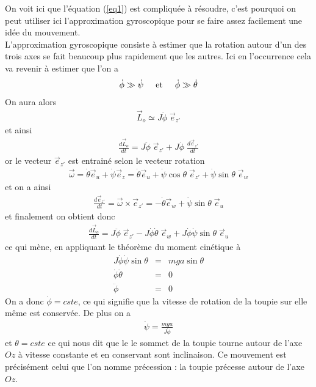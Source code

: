 \documentclass[12pt,prb,aps,epsf]{article}
\begin{document}
On voit ici que l'équation (\ref{eq1}) est compliquée à résoudre, c'est pourquoi on peut utiliser ici l'approximation gyroscopique pour se faire assez facilement une idée du mouvement.\\
L'approximation gyroscopique consiste à estimer que la rotation autour d'un des trois axes se fait beaucoup plus rapidement que les autres. Ici en l'occurrence cela va revenir à estimer que l'on a 
\begin{eqnarray}
\dot{\phi} \gg \dot{\psi}\hspace{0.5cm}\mathrm{et} \hspace{0.5cm} \dot{\phi} \gg \dot{\theta}
\end{eqnarray} 
On aura alors 
\begin{eqnarray}
\vec{L}_o \simeq J\dot{\phi}\; \vec{e}_{z'}
\end{eqnarray}
et ainsi 
\begin{eqnarray}
\frac{d\vec{L}_o}{dt} = J\ddot{\phi}\; \vec{e}_{z'} + J\dot{\phi}\; \frac{d\vec{e}_{z'}}{dt}
\end{eqnarray}
or le vecteur $\vec{e}_{z'}$ est entrainé selon le vecteur rotation 
\begin{eqnarray}
\vec{\omega} = \dot{\theta}\vec{e}_u + \dot{\psi}\vec{e}_z = \dot{\theta}\vec{e}_u + \dot{\psi}\cos{\theta}\; \vec{e}_{z'}  + \dot{\psi}\sin{\theta}\;\vec{e}_w
\end{eqnarray}
 et on a ainsi 
\begin{eqnarray}
 \frac{d\vec{e}_{z'}}{dt} = \vec{\omega}\times \vec{e}_{z'} = -\dot{\theta}\vec{e}_w + \dot{\psi} \sin{\theta}\; \vec{e}_u
\end{eqnarray}
et finalement on obtient donc
\begin{eqnarray}
\frac{d\vec{L}_o}{dt} = J\ddot{\phi}\; \vec{e}_{z'} - J\dot{\phi} \dot{\theta}\;\vec{e}_w + J\dot{\phi}\dot{\psi} \sin{\theta}\; \vec{e}_u
\end{eqnarray}
ce qui mène, en appliquant le théorème du moment cinétique à 
\begin{eqnarray}
J\dot{\phi}\dot{\psi} \sin{\theta} &=& mga \sin\theta\\
\dot{\phi} \dot{\theta} &=& 0\\
\ddot{\phi} &=& 0
\end{eqnarray}
On a donc $\dot{\phi}= cste$, ce qui signifie que la vitesse de rotation de la toupie sur elle même est conservée. De plus on a 
\begin{eqnarray}
\dot{\psi} = \frac{mga}{J\dot{\phi}}
\end{eqnarray}
et $\theta =cste$ ce qui nous dit que le le sommet de la toupie tourne autour de l'axe $Oz$ à vitesse constante et en conservant sont inclinaison.
Ce mouvement est précisément celui que l'on nomme précession : la toupie précesse autour de l'axe $Oz$.\\
\end{document}
